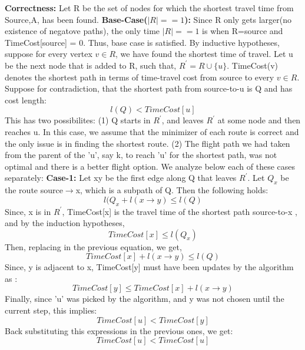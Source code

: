 \documentclass{article}
\newcommand\correctness{\vspace{.10in}\textbf{Correctness: }}
\begin{document}
\correctness 
  Let R be the set of nodes for which the shortest travel time from Source,A, has been found. \textbf {Base-Case($|R|==1$):}  Since R only gets larger(no existence of negatove paths), the only time $|R|==1$ is when R={source} and TimeCost[source] = 0. Thus, base case is satisfied. \newline
  By inductive hypotheses, suppose for every vertex $v \in R$, we have found the shortest time of travel. Let u be the next node that is added to R, such that, $R^\prime = R \cup \{u\}$. TimeCost(v) denotes the shortest path in terms of time-travel cost from source to every $v \in R$. Suppose for contradiction, that the shortest path from source-to-u is Q and has cost length: \newline
  \[ l(Q) < TimeCost[u] \]
  This has two possibilites: \newline
  (1) Q starts in $R^\prime$, and leaves $R^\prime$ at some node and then reaches u. In this case, we assume that the minimizer of each route is correct and the only issue is in finding the shortest route. \newline
  (2) The flight path we had taken from the parent of the 'u', say k, to reach 'u' for the shortest path, was not optimal and there is a better flight option.  \newline
  We analyze below each of these cases separately: \newline
  \textbf {Case-1:} Let xy be the first edge along Q that leaves $R^\prime$. Let $Q_{x}$ be the route source$\rightarrow$x, which is a subpath of Q. Then the following holds:\newline
  \[ l(Q_{x} + l(x\rightarrow y) \leq l(Q) \]
  Since, x is in $R^\prime$, TimeCost[x] is the travel time of the shortest path source-to-x , and by the induction hypotheses, \newline
  \[ TimeCost[x] \leq l(Q_{x}) \]
  Then, replacing in the previous equation, we get, \newline
  \[ TimeCost[x] + l(x\rightarrow y) \leq l(Q) \]
  Since, y is adjacent to x, TimeCost[y] must have been updates by the algorithm as : \newline
  \[ TimeCost[y] \leq TimeCost[x] + l(x \rightarrow y) \]
  Finally, since 'u' was picked by the algorithm, and y was not chosen until the current step, this implies: \newline
  \[ TimeCost[u] < TimeCost[y] \]
  Back substituting this expressions in the previous ones, we get: \newline
  \[ TimeCost[u] < TimeCost[u] \]
\end{document}
